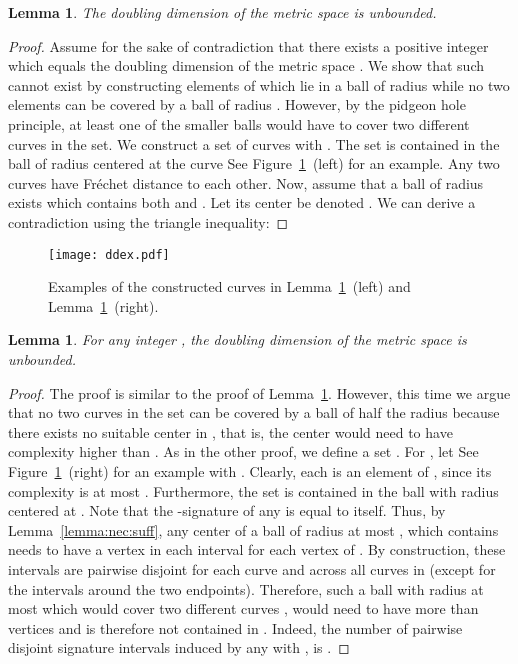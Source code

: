 \documentclass[11pt, letter]{article}
\newtheorem{lemma}[theorem]{Lemma}
\newcommand{\lemref}[1]{Lemma~\ref{lemma:#1}}
\newcommand{\figlab}[1]{\label{fig:#1}}
\newcommand{\figref}[1]{Figure~\ref{fig:#1}}
\newcommand{\Frechet}{Fr\'echet\xspace}
\begin{document}
\begin{lemma}
\label{lemma:doub:unlimit}
The doubling dimension of the metric space  is unbounded.
\end{lemma}

\begin{proof}
Assume for the sake of contradiction that there exists a positive integer 
which equals the doubling dimension of the metric space .  We
show that such  cannot exist by constructing  elements of
 which lie in a ball of radius  while no two elements can be
covered by a ball of radius .  However, by the pidgeon hole principle, at
least one of the smaller balls would have to cover two different curves in the set. 
We construct a set of curves
 with . The set
 is contained in the ball of radius  centered at the curve
 See \figref{ddex}~(left) for an example.
Any two curves 
have \Frechet distance  to each other.  Now, assume that a ball of
radius  exists which contains both  and . Let 
its center be denoted . We can derive a contradiction using the triangle inequality:

\end{proof}

\begin{figure}
\centering
\texttt{[image: ddex.pdf]}
\caption{Examples of the constructed curves in \lemref{doub:unlimit}~(left) and \lemref{doub:limit}~(right). }
\figlab{ddex}
\end{figure}



\begin{lemma}
\label{lemma:doub:limit}
For any integer , the doubling dimension of the metric space  is unbounded.
\end{lemma}
\begin{proof}
The proof is similar to the proof of \lemref{doub:unlimit}. However, this time we argue that no two 
curves in the set can be covered by a ball of half the radius because there exists no suitable 
center in , that is, the center would need to have complexity higher than .
As in the other proof, we define a set .
For , let  
See \figref{ddex}~(right) for an example with .
Clearly, each  is an element of , since its complexity is at most .
Furthermore, the set  is contained in the ball with radius  centered at .
Note that the -signature of any  is equal to  itself.
Thus, by \lemref{nec:suff}, any center of a ball of radius at most , which contains 
 needs to have a vertex in each interval  for each vertex  of .
By construction, these intervals are pairwise disjoint for each curve and
across all curves in  (except for the intervals around the two endpoints).
Therefore, such a ball with radius at most  which would cover two
different curves , would need to have more than 
vertices and is therefore not contained in .
Indeed,  the number of pairwise disjoint signature intervals induced by any  with ,
is .
\end{proof}





      
\end{document}
